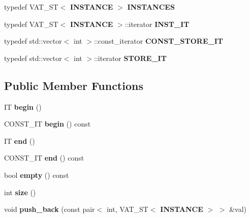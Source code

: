 \begin{CompactItemize}
\item 
typedef VAT\_\-ST$<$ {\bf INSTANCE} $>$ {\bf INSTANCES}\label{classvat_3_01TREE__PROP_00_01V__Fkk__IND__MINE__PROP_00_01VAT__ST_01_4_w7}

\item 
typedef VAT\_\-ST$<$ {\bf INSTANCE} $>$::iterator {\bf INST\_\-IT}\label{classvat_3_01TREE__PROP_00_01V__Fkk__IND__MINE__PROP_00_01VAT__ST_01_4_w8}

\item 
typedef std::vector$<$ int $>$::const\_\-iterator {\bf CONST\_\-STORE\_\-IT}\label{classvat_3_01TREE__PROP_00_01V__Fkk__IND__MINE__PROP_00_01VAT__ST_01_4_w9}

\item 
typedef std::vector$<$ int $>$::iterator {\bf STORE\_\-IT}\label{classvat_3_01TREE__PROP_00_01V__Fkk__IND__MINE__PROP_00_01VAT__ST_01_4_w10}

\end{CompactItemize}
\subsection*{Public Member Functions}
\begin{CompactItemize}
\item 
IT {\bf begin} ()\label{classvat_3_01TREE__PROP_00_01V__Fkk__IND__MINE__PROP_00_01VAT__ST_01_4_a0}

\item 
CONST\_\-IT {\bf begin} () const \label{classvat_3_01TREE__PROP_00_01V__Fkk__IND__MINE__PROP_00_01VAT__ST_01_4_a1}

\item 
IT {\bf end} ()\label{classvat_3_01TREE__PROP_00_01V__Fkk__IND__MINE__PROP_00_01VAT__ST_01_4_a2}

\item 
CONST\_\-IT {\bf end} () const \label{classvat_3_01TREE__PROP_00_01V__Fkk__IND__MINE__PROP_00_01VAT__ST_01_4_a3}

\item 
bool {\bf empty} () const \label{classvat_3_01TREE__PROP_00_01V__Fkk__IND__MINE__PROP_00_01VAT__ST_01_4_a4}

\item 
int {\bf size} ()\label{classvat_3_01TREE__PROP_00_01V__Fkk__IND__MINE__PROP_00_01VAT__ST_01_4_a5}

\item 
void {\bf push\_\-back} (const  pair$<$ int, VAT\_\-ST$<$ {\bf INSTANCE} $>$ $>$ \&val)
\end{CompactItemize}

